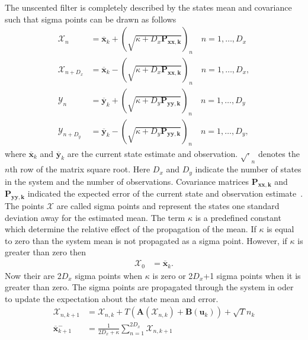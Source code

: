 The unscented filter is completely described by the states mean and covariance such that sigma points can be drawn as follows\begin{align}
\label{eqn: Unscented_Transform1}
\mathbf{\mathcal{X}}_{n} &= \mathbf{\overline{x}}_{k} + (\sqrt{\kappa+D_{x}\mathbf{P_{xx,k}}})_{n} \quad n=1,\hdots,D_x\\
\label{eqn: Unscented_Transform2}
\mathbf{\mathcal{X}}_{n+D_{x}} &= \mathbf{\overline{x}}_{k} - (\sqrt{\kappa+D_{x}\mathbf{P_{xx,k}}})_{n} \quad n=1,\hdots,D_x,\\
\label{eqn: Unscented_TransformY1}
\mathbf{\mathcal{Y}}_{n} &= \mathbf{\overline{y}}_{k} + (\sqrt{\kappa+D_{y}\mathbf{P_{yy,k}}})_{n} \quad n=1,\hdots,D_y\\
\label{eqn: Unscented_TransformY2}
\mathbf{\mathcal{Y}}_{n+D_{y}} &= \mathbf{\overline{y}}_{k} - (\sqrt{\kappa+D_{y}\mathbf{P_{yy,k}}})_{n} \quad n=1,\hdots,D_y,
\end{align} where $\mathbf{\overline{x}}_{k}$ and $\mathbf{\overline{y}}_{k}$ are the current state estimate and observation. $\sqrt{\cdot}_{n}$ denotes the $n$th row of the matrix square root. Here $D_{x}$ and $D_{y}$ indicate the number of states in the system and the number of observations. Covariance matrices $\mathbf{P_{xx,k}}$ and $\mathbf{P_{yy,k}}$ indicated the expected error of the current state and observation estimate~. The points $\mathbf{\mathcal{X}}$ are called sigma points and represent the states one standard deviation away for the estimated mean. The term $\kappa$ is a predefined constant which determine the relative effect of the propagation of the mean. If $\kappa$ is equal to zero than the system mean is not propagated as a sigma point. However, if $\kappa$ is greater than zero then \begin{align}
\mathbf{\mathcal{X}}_{0} &= \mathbf{\overline{x}}_{k}.
\end{align} Now their are 2$D_{x}$ sigma points when $\kappa$ is zero or 2$D_{x}$+1 sigma points when it is greater than zero. The sigma points are propagated through the system in oder to update the expectation about the state mean and error. \begin{align}%
\mathbf{\mathcal{X}}_{n,k+1} &= \mathbf{\mathcal{X}}_{n,k}+ T(\mathbf{A}(\mathbf{\mathcal{X}}_{n,k}) +\mathbf{B}(\mathbf{u}_{k})) +\sqrt{T}{n}_{k}\\
\overline{\mathbf{x}}_{k+1}^{-} &= \frac{1}{2D_{x}+\kappa}\sum_{n=1}^{2D_{x}} \mathbf{\mathcal{X}}_{n,k+1}\\

\end{align}
